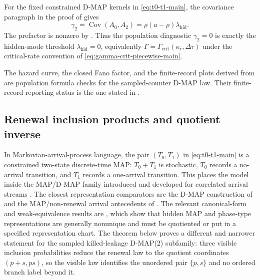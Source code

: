 \begin{remark}\label{rem:diagnostics-consistency-only-main}
For the fixed constrained D-MAP kernels in
\eqref{eq:t0-t1-main}, the covariance paragraph in the proof of
 gives
\[
\gamma_2=\operatorname{Cov}(A_0,A_2)=\rho(a-\rho)\lambda_{\mathrm{hid}} .
\]
The prefactor is nonzero by .  Thus the population
diagnostic \(\gamma_2=0\) is exactly the hidden-mode threshold
\(\lambda_{\mathrm{hid}}=0\), equivalently
\(\Gamma=\Gamma_{\mathrm{crit}}(\kappa_{\mathrm r},\Delta\tau)\) under the
critical-rate convention of \eqref{eq:gamma-crit-piecewise-main}.

The hazard curve, the closed Fano factor, and the finite-record plots derived
from  are population formula
checks for the sampled-counter D-MAP law.  Their finite-record reporting status is
the one stated in .
\end{remark}

\subsection{Renewal inclusion products and quotient inverse}

In Markovian-arrival-process language, the pair \((T_0,T_1)\) in
\eqref{eq:t0-t1-main} is a constrained two-state discrete-time MAP:
\(T_0+T_1\) is stochastic, \(T_0\) records a no-arrival transition, and
\(T_1\) records a one-arrival transition.  This places the model inside the
MAP/D-MAP family introduced and developed for correlated arrival streams
\cite{Neuts1979MAP,Lucantoni1991BMAP,AlfaNeuts1995DMAP,
Chakravarthy2010MAPSurvey,AsanjaraniNazarathy2022MAP}.  The closest
representation comparators are the D-MAP construction of
\cite{AlfaNeuts1995DMAP} and the MAP/non-renewal arrival antecedents of
\cite{LucantoniMeierHellsternNeuts1990Vacations}.  The relevant
canonical-form and weak-equivalence results are
\cite{Ryden1996Aggregated,BodrogHeindlHorvathTelek2008MAP2Canonical,
RamirezCoboLilloWiper2010MAP2Nonidentifiability,
RamirezCoboLillo2012WeakEquivalentMAP}, which show that hidden MAP and
phase-type representations are generally nonunique and must be quotiented or
put in a specified representation chart.  The theorem below proves a different
and narrower statement for the sampled killed-leakage D-MAP(2) subfamily:
three visible inclusion probabilities reduce the renewal law to the quotient
coordinates \((p+s,ps)\), so the visible law identifies the unordered pair
\(\{p,s\}\) and no ordered branch label beyond it.

